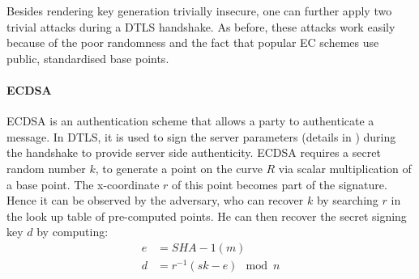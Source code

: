 % 
Besides rendering key generation trivially insecure, one can further apply two trivial attacks  during a DTLS handshake. As before, these attacks work easily because of the poor randomness and the fact that popular EC schemes use public, standardised base points.

\paragraph{\textbf{ECDSA}}
	ECDSA\cite{ECDSA} is an authentication scheme that allows a party to authenticate a message. In DTLS, it is used to sign the server parameters (details in \cite{rfc3279}) during the handshake to provide server side authenticity. ECDSA requires a secret random number $k$, to generate a point on the curve $R$ via scalar multiplication of a base point. The x-coordinate $r$ of this point becomes part of the signature. Hence it can be observed by the adversary, who can recover $k$ by searching $r$ in the look up table of pre-computed points. He can then recover the secret signing key $d$ by computing:
	\begin{equation}
		\begin{aligned}
		e &= SHA-1(m) \\
		d &= r^{-1}(sk - e) \mod n
		\end{aligned}
	\end{equation}
	
	
